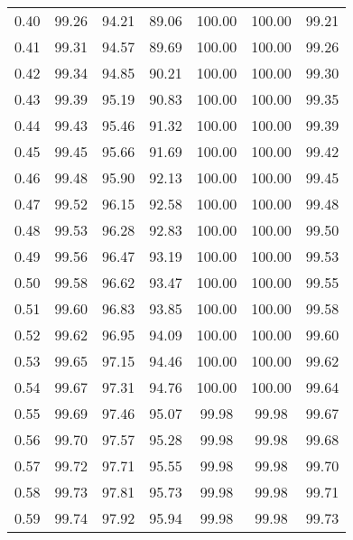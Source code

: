 \begin{tabular}{|c|c|c|c|c|c|c|}
      0.40 &     99.26 &     94.21 &      89.06 &  100.00 &     100.00 &         99.21 \\
      0.41 &     99.31 &     94.57 &      89.69 &  100.00 &     100.00 &         99.26 \\
      0.42 &     99.34 &     94.85 &      90.21 &  100.00 &     100.00 &         99.30 \\
      0.43 &     99.39 &     95.19 &      90.83 &  100.00 &     100.00 &         99.35 \\
      0.44 &     99.43 &     95.46 &      91.32 &  100.00 &     100.00 &         99.39 \\
      0.45 &     99.45 &     95.66 &      91.69 &  100.00 &     100.00 &         99.42 \\
      0.46 &     99.48 &     95.90 &      92.13 &  100.00 &     100.00 &         99.45 \\
      0.47 &     99.52 &     96.15 &      92.58 &  100.00 &     100.00 &         99.48 \\
      0.48 &     99.53 &     96.28 &      92.83 &  100.00 &     100.00 &         99.50 \\
      0.49 &     99.56 &     96.47 &      93.19 &  100.00 &     100.00 &         99.53 \\
      0.50 &     99.58 &     96.62 &      93.47 &  100.00 &     100.00 &         99.55 \\
      0.51 &     99.60 &     96.83 &      93.85 &  100.00 &     100.00 &         99.58 \\
      0.52 &     99.62 &     96.95 &      94.09 &  100.00 &     100.00 &         99.60 \\
      0.53 &     99.65 &     97.15 &      94.46 &  100.00 &     100.00 &         99.62 \\
      0.54 &     99.67 &     97.31 &      94.76 &  100.00 &     100.00 &         99.64 \\
      0.55 &     99.69 &     97.46 &      95.07 &   99.98 &      99.98 &         99.67 \\
      0.56 &     99.70 &     97.57 &      95.28 &   99.98 &      99.98 &         99.68 \\
      0.57 &     99.72 &     97.71 &      95.55 &   99.98 &      99.98 &         99.70 \\
      0.58 &     99.73 &     97.81 &      95.73 &   99.98 &      99.98 &         99.71 \\
      0.59 &     99.74 &     97.92 &      95.94 &   99.98 &      99.98 &         99.73 \\

\end{tabular}
